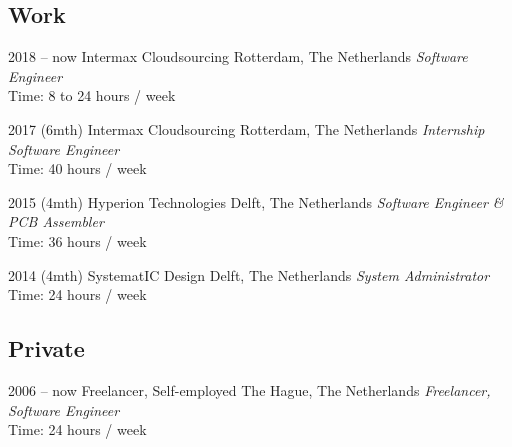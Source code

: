 \documentclass[]{friggeri-cv}
\begin{document}
\subsection{Work}

\begin{entrylist}


\entry
{2018 -- now}
{Intermax Cloudsourcing}
{Rotterdam, The Netherlands}
{\emph{Software Engineer} \\
Time: 8 to 24 hours / week}


\entry
{2017 (6mth)}
{Intermax Cloudsourcing}
{Rotterdam, The Netherlands}
{\emph{Internship Software Engineer} \\
Time: 40 hours / week}


\entry
{2015 (4mth)}
{Hyperion Technologies}
{Delft, The Netherlands}
{\emph{Software Engineer \& PCB Assembler} \\
Time: 36 hours / week}


\entry
{2014 (4mth)}
{SystematIC Design}
{Delft, The Netherlands}
{\emph{System Administrator} \\
Time: 24 hours / week}


\end{entrylist}

\subsection{Private}

\begin{entrylist}


\entry
{2006 -- now}
{Freelancer, Self-employed}
{The Hague, The Netherlands}
{\emph{Freelancer, Software Engineer} \\
Time: 24 hours / week}


\end{entrylist}

\newpage{}

\end{document}
